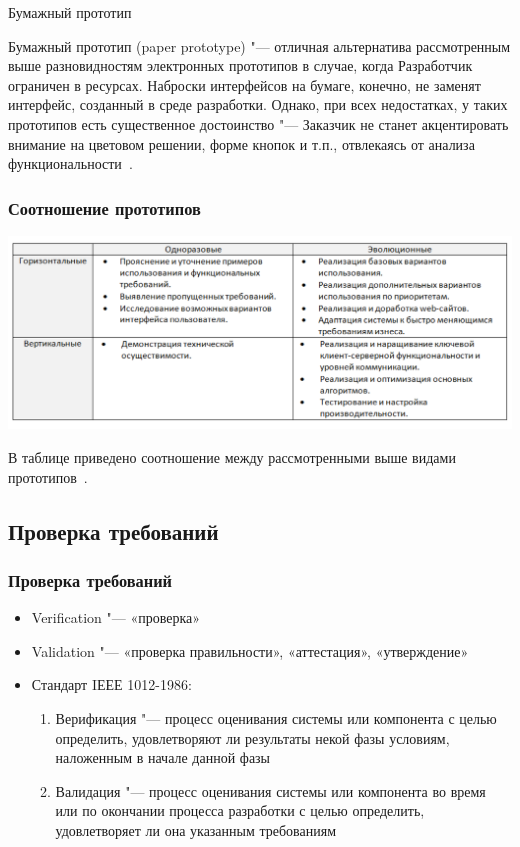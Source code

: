 \documentclass{../industrial-development}
\begin{document}
{\alert{Бумажный прототип}

Бумажный прототип (paper prototype) "--- отличная альтернатива рассмотренным выше разновидностям электронных прототипов в случае, когда Разработчик ограничен в ресурсах. Наброски интерфейсов на бумаге, конечно, не заменят интерфейс, созданный в среде разработки. Однако, при всех недостатках, у таких прототипов есть существенное достоинство "--- Заказчик не станет акцентировать внимание на цветовом решении, форме кнопок и т.п., отвлекаясь от анализа функциональности~\cite[с.~54--55]{Maglinec}.

\begin{frame} \frametitle {Соотношение прототипов}
 \centerline{\includegraphics[width=1.2\textwidth]{pict8.pdf}}
\end{frame}

\lecturenotes

В таблице приведено соотношение между рассмотренными выше видами прототипов~\cite[с.~55]{Maglinec}.

\subsection{Проверка требований}
\begin{frame} \frametitle {Проверка требований}
\begin{itemize}
\item \alert{Verification} "--- «проверка»
\item \alert{Validation} "--- «проверка правильности», «аттестация», «утверждение»
\item Стандарт IЕЕЕ 1012-1986:
\begin{enumerate}
\item \alert{Верификация} "--- процесс оценивания системы или компонента с целью определить, удовлетворяют ли результаты некой фазы условиям, наложенным в начале данной фазы
\item \alert{Валидация} "--- процесс оценивания системы или компонента во время или по окончании процесса разработки с целью определить, удовлетворяет ли она указанным требованиям
\end{enumerate}
\end{itemize}


\end{frame}}
\end{document}

